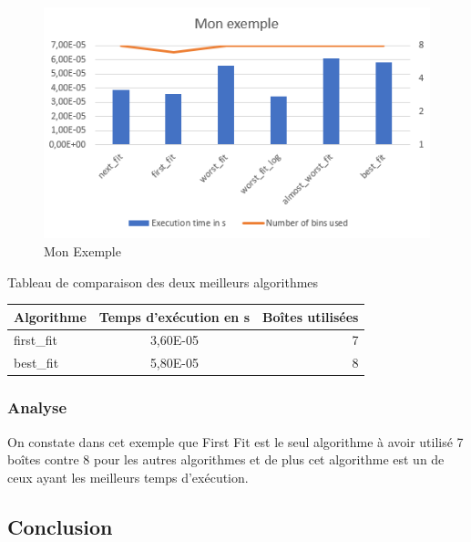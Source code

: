 \documentclass{article}
\begin{document}
\begin{figure}[h]
\begin{center}
\includegraphics{monexemple.png}
\end{center}
\caption{Mon Exemple}
\end{figure}

\begin{center}
Tableau de comparaison des deux meilleurs algorithmes

\begin{tabular}{|l|c|r|}
  \hline
  Algorithme & Temps d'exécution en s & Boîtes utilisées \\
  \hline
  first\_fit & 3,60E-05  & 7 \\
  best\_fit & 5,80E-05  & 8 \\
  \hline
\end{tabular}
\end{center}

\subsubsection{Analyse}
On constate dans cet exemple que First Fit est le seul algorithme à avoir utilisé 7 boîtes contre 8 pour les autres algorithmes et de plus cet algorithme est
un de ceux ayant les meilleurs temps d'exécution.

\clearpage
\subsection{Conclusion}
\end{document}

